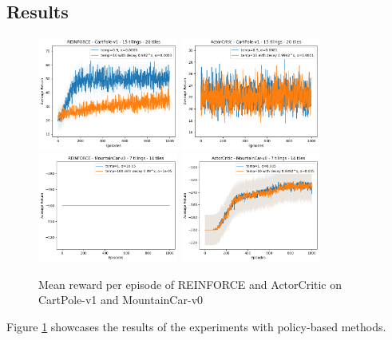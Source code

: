 \documentclass{article}
\begin{document}
\subsection{Results}

\begin{figure}[htbp]
  \centering
  \includegraphics[width=0.41\textwidth]{q2_1.png}
  \includegraphics[width=0.41\textwidth]{q2_2.png}\\
  \includegraphics[width=0.41\textwidth]{q2_3.png}
  \includegraphics[width=0.41\textwidth]{q2_4.png}
  \caption{Mean reward per episode of REINFORCE and ActorCritic on CartPole-v1 and MountainCar-v0}\label{fig:q3}
\end{figure}

Figure \ref{fig:q3} showcases the results of the experiments with policy-based methods.
\end{document}
